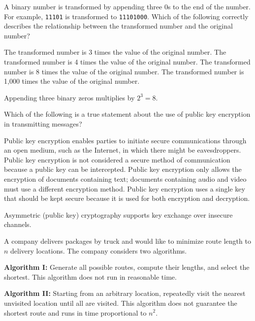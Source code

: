 \newpage



\question[5]
A binary number is transformed by appending three 0s to the end of the number. For example, \texttt{11101} is transformed to \texttt{11101000}. Which of the following correctly describes the relationship between the transformed number and the original number?
\begin{choices}
  \choice The transformed number is 3 times the value of the original number.
  \choice The transformed number is 4 times the value of the original number.
  \CorrectChoice The transformed number is 8 times the value of the original number.
  \choice The transformed number is 1,000 times the value of the original number.
\end{choices}
\begin{solution}
  Appending three binary zeros multiplies by $2^3=8$.
\end{solution}



\question[5]
Which of the following is a true statement about the use of public key encryption in transmitting messages?
\begin{choices}
  \CorrectChoice Public key encryption enables parties to initiate secure communications through an open medium, such as the Internet, in which there might be eavesdroppers.
  \choice Public key encryption is not considered a secure method of communication because a public key can be intercepted.
  \choice Public key encryption only allows the encryption of documents containing text; documents containing audio and video must use a different encryption method.
  \choice Public key encryption uses a single key that should be kept secure because it is used for both encryption and decryption.
\end{choices}
\begin{solution}
  Asymmetric (public key) cryptography supports key exchange over insecure channels.
\end{solution}

\question[5]
A company delivers packages by truck and would like to minimize route length to $n$ delivery locations. The company considers two algorithms.

\textbf{Algorithm I:} Generate all possible routes, compute their lengths, and select the shortest. This algorithm does not run in reasonable time.

\textbf{Algorithm II:} Starting from an arbitrary location, repeatedly visit the nearest unvisited location until all are visited. This algorithm does not guarantee the shortest route and runs in time proportional to $n^2$.

